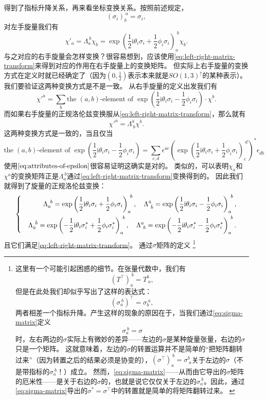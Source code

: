 \documentclass[hyperref, UTF8, a4paper]{ctexart}
\newcommand*{\ii}{\mathrm{i}}
\newenvironment{bigcase}{\left\{\quad\begin{aligned}}{\end{aligned}\right.}
\begin{document}
得到了指标升降关系，再来看坐标变换关系。按照前述规定，
\[
    (\sigma_i)_b^{\ a} = \sigma_i,
\]
对左手旋量我们有
\[
    \chi'_a = \Lambda_a^{\ b} \chi_b = \exp \left( \frac{1}{2} \ii \theta_i \sigma_i + \frac{1}{2} \phi_i \sigma_i \right)_a^{\; b} \chi_b.
\]
与之对应的右手旋量会怎样变换？很容易想到，应该使用\eqref{eq:left-right-matrix-transform}来得到对应的作用在右手旋量上的变换矩阵。
但实际上右手旋量的变换方式在定义时就已经确定了（因为$(0, \frac{1}{2})$表示本来就是$SO(1,3)^\uparrow$的某种表示）。
我们要验证这两种变换方式是不是一致。
从右手旋量的定义出发我们有
\[
    {\chi'}^{\dot{a}} = \sum_b \text{the $(a,b)$-element of } \exp \left( \frac{1}{2} \ii \theta_i \sigma_i - \frac{1}{2} \phi_i \sigma_i \right) \cdot \chi^{\dot{b}} .
\]
而如果右手旋量的正规洛伦兹变换服从\eqref{eq:left-right-matrix-transform}，那么就有
\[
    {\chi'}^{\dot{a}} = \Lambda^{\dot{a}}_{\ \dot{b}} \chi^{\dot{b}}.
\]
这两种变换方式是一致的，当且仅当
\[
    \text{the $(a,b)$-element of } \exp \left( \frac{1}{2} \ii \theta_i \sigma_i - \frac{1}{2} \phi_i \sigma_i \right) = \sum_{c,d} \epsilon^{\dot{a} \dot{c}} \left(\exp \left( \frac{1}{2} \ii \theta_i \sigma_i + \frac{1}{2} \phi_i \sigma_i \right)_c^{\; d}\right)^* \epsilon_{\dot{d} \dot{b}}
\]
使用$\eqref{eq:attributes-of-epsilon}$很容易证明这确实是对的。
类似的，可以表明$\chi_{\dot{a}}$和$\chi^a$的变换矩阵正是$\Lambda_a^{\ b}$通过\eqref{eq:left-right-matrix-transform}变换得到的。
因此我们就得到了旋量的正规洛伦兹变换：
\begin{equation}
    \begin{bigcase}
        \Lambda_a^{\ b} = \exp \left( \frac{1}{2} \ii \theta_i \sigma_i + \frac{1}{2} \phi_i \sigma_i \right)_a^{\ b}, \quad \Lambda^{\dot{a}}_{\ \dot{b}} = \exp \left( \frac{1}{2} \ii \theta_i \sigma_i - \frac{1}{2} \phi_i \sigma_i \right)_a^{\ b}, \\
        \Lambda_{\dot{a}}^{\ \dot{b}} = \exp \left( - \frac{1}{2} \ii \theta_i \sigma_i^* + \frac{1}{2} \phi_i \sigma_i^* \right)_a^{\ b}, \quad \Lambda^{a}_{\ b} = \exp \left( - \frac{1}{2} \ii \theta_i \sigma_i^* - \frac{1}{2} \phi_i \sigma_i^* \right)_a^{\ b}.
        \label{eq:lorentz-transform-on-spinors}
    \end{bigcase}
\end{equation}
且它们满足\eqref{eq:left-right-matrix-transform}。
通过$\sigma$矩阵的定义%
\footnote{这里有一个可能引起困惑的细节。在张量代数中，我们有
\[
    (T^\top)_a^{\ b} = T^b_{\ a},
\]
但是在此处我们却似乎写出了这样的表达式：
\[
    (\sigma_a^{\ b})^\top = \sigma_b^{\ a},
\]
两者相差一个指标升降。产生这样的现象的原因在于，当我们通过\eqref{eq:sigma-matrix}定义
\[
    \sigma_a^{\ b} = \sigma
\]
时，左右两边的$\sigma$实际上有微妙的差异——左边的$\sigma$是某种旋量张量，右边的$\sigma$只是一个矩阵。
这就意味着，左边的$\sigma$的转置运算并不是简单的“把矩阵翻转过来”（因为转置之后的结果必须是协变的），$(\sigma^\top)_a^{\ b} = \sigma^b_{\ a}$关于左边的$\sigma$（不是带指标的$\sigma_a^{\ b}$！）成立。
然而，\eqref{eq:sigma-matrix}——从而由它导出的$\sigma$矩阵的厄米性——是关于右边的$\sigma$的，也就是说它仅仅关于左边的$\sigma_a^{\ b}$。因此，通过\eqref{eq:sigma-matrix}导出的$\sigma^*=\sigma^\top$中的转置就是简单的将矩阵翻转过来。
\label{note:confusion-by-transpose}
}%
\end{document}
